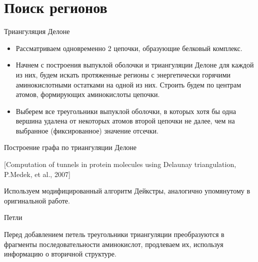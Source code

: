 \documentclass[12pt, xcolor={dvipsnames}]{beamer}
\begin{document}
\section{Поиск регионов}
\begin{frame}{Триангуляция Делоне}
\begin{itemize}
\item Рассматриваем одновременно 2 цепочки, образующие белковый комплекс.
\item Начнем с построения выпуклой оболочки и триангуляции Делоне для каждой из них, будем искать протяженные регионы с энергетически горячими аминокислотными остатками  на одной из них. Строить будем по центрам атомов, формирующих аминокислоты цепочки.
\item Выберем все треугольники выпуклой оболочки, в которых хотя бы одна вершина удалена от некоторых атомов второй цепочки не далее, чем на выбранное (фиксированное) значение отсечки.
\end{itemize}
\end{frame}

\begin{frame}{Построение графа по триангуляции Делоне}
\begin{center}

[Computation of tunnels in protein molecules using
Delaunay triangulation, P.Medek, et al., 2007]
\end{center}

Используем модифицированный алгоритм Дейкстры, аналогично упомянутому в оригинальной работе.
\end{frame}

\begin{frame}{Петли}

Перед добавлением петель треугольники триангуляции преобразуются в фрагменты последовательности аминокислот, продлеваем их, используя информацию о вторичной структуре.

\end{frame}
\end{document}
